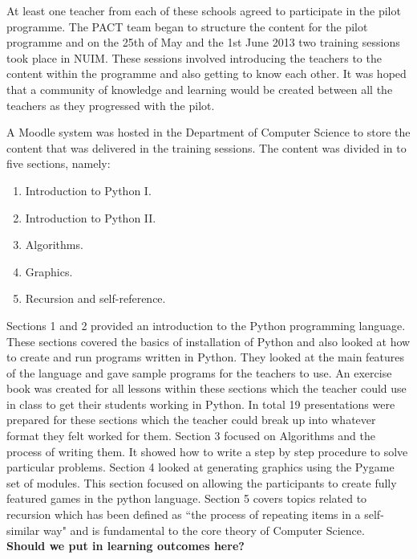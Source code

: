 \documentclass{article}
\begin{document}
At least one teacher from each of these schools agreed to participate in the pilot programme. The PACT team began to structure the content for the pilot programme and on the 25th of May and the 1st June 2013 two training sessions took place in NUIM. These sessions involved introducing the teachers to the content within the programme and also getting to know each other. It was hoped that a community of knowledge and learning would be created between all the teachers as they progressed with the pilot.

A Moodle system was hosted in the Department of Computer Science to store the content that was delivered in the training sessions. The content was divided in to five sections, namely:

\begin{enumerate}
  \item Introduction to Python I.
  \item Introduction to Python II.
  \item Algorithms.
  \item Graphics.
  \item Recursion and self-reference.
\end{enumerate}

Sections 1 and 2 provided an introduction to the Python programming language. These sections covered the basics of installation of Python and also looked at how to create and run programs written in Python. They looked at the main features of the language and gave sample programs for the teachers to use. An exercise book was created for all lessons within these sections which the teacher could use in class to get their students working in Python. In total 19 presentations were prepared for these sections which the teacher could break up into whatever format they felt worked for them. Section 3 focused on Algorithms and the process of writing them. It showed how to write a step by step procedure to solve particular problems. Section 4 looked at generating graphics using the Pygame set of modules. This section focused on allowing the participants to create fully featured games in the python language. Section 5 covers topics related to recursion which has been defined as ``the process of repeating items in a self-similar way" and is fundamental to the core theory of Computer Science. \\


\textbf{Should we put in learning outcomes here?}
\newline
\end{document}
